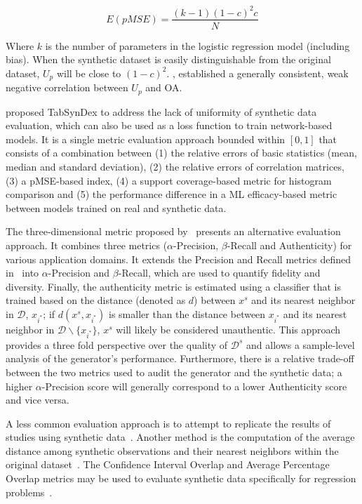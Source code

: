 \documentclass[parskip=full]{scrartcl}
\begin{document}
\begin{equation}
    E(pMSE) = \frac{(k-1)(1-c)^2c}{N}
\end{equation}

Where $k$ is the number of parameters in the logistic regression model
(including bias). When the synthetic dataset is easily distinguishable from
the original dataset, $U_p$ will be close to ${(1-c)}^2$.
\citet{dankar2021fake}, established a generally consistent, weak negative
correlation between $U_p$ and OA\@.

\citet{chundawat2022tabsyndex} proposed TabSynDex to address the lack of
uniformity of synthetic data evaluation, which can also be used as a loss
function to train network-based models. It is a single metric evaluation
approach bounded within $[0,1]$ that consists of a combination between (1) the
relative errors of basic statistics (mean, median and standard deviation), (2)
the relative errors of correlation matrices, (3) a pMSE-based index, (4) a
support coverage-based metric for histogram comparison and (5) the performance
difference in a ML efficacy-based metric between models trained on real and
synthetic data.

The three-dimensional metric proposed by~\citet{alaa2022faithful} presents an
alternative evaluation approach. It combines three metrics
($\alpha$-Precision, $\beta$-Recall and Authenticity) for various application
domains. It extends the Precision and Recall metrics defined
in~\cite{sajjadi2018assessing} into $\alpha$-Precision and $\beta$-Recall,
which are used to quantify fidelity and diversity. Finally, the authenticity
metric is estimated using a classifier that is trained based on the distance
(denoted as $d$) between $x^s$ and its nearest neighbor in $\mathcal{D}$,
$x_{i^*}$; if $d(x^s, x_{i^*})$ is smaller than the distance between $x_{i^*}$
and its nearest neighbor in $\mathcal{D}\backslash \{x_{i^*}\}$, $x^s$ will
likely be considered unauthentic. This approach provides a three fold
perspective over the quality of $\mathcal{D}^s$ and allows a sample-level
analysis of the generator's performance. Furthermore, there is a relative
trade-off between the two metrics used to audit the generator and the
synthetic data; a higher $\alpha$-Precision score will generally correspond to
a lower Authenticity score and vice versa.

A less common evaluation approach is to attempt to replicate the results of
studies using synthetic data~\cite{el2020seven, benaim2020analyzing,
rosenblatt2022epistemic}. Another method is the computation of the
average distance among synthetic observations and their nearest neighbors
within the original dataset~\cite{hittmeir2019utility}. The Confidence
Interval Overlap and Average Percentage Overlap metrics may be used to
evaluate synthetic data specifically for regression
problems~\cite{khan2022utility, karr2006framework}.
\end{document}
